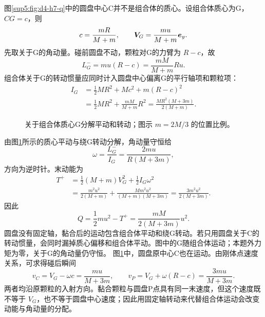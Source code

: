 \begin{solution}
图\ref{sup5:fig:d4-h7-q}中的圆盘中心C并不是组合体的质心。设组合体质心为G，$CG=c$，则
\begin{equation}
 c=\frac{mR}{M+m},\qquad
 \bm{V}_G=\frac{mu}{M+m}\bm{e}_y.
\end{equation}
先取关于G的角动量。碰前圆盘不动，颗粒对G的力臂为 $R-c$，故
\begin{equation}
 L_G^-=mu(R-c)=\frac{mM}{M+m}Ru.
\end{equation}
组合体关于G的转动惯量应同时计入圆盘中心偏离G的平行轴项和颗粒项：
\begin{align}
 I_G&=\frac12MR^2+Mc^2+m(R-c)^2\\
 &=\frac12MR^2+\frac{mM}{M+m}R^2
 =\frac{MR^2(M+3m)}{2(M+m)}.
\end{align}
\begin{figure}[H]\centering
{}
\caption{关于组合体质心G分解平动和转动；图示 $m=2M/3$ 的位置比例。}\label{sup5:fig:d4-h7-s}
\end{figure}
由图\ref{sup5:fig:d4-h7-s}所示的质心平动与绕G转动分解，角动量守恒给
\begin{equation}
 \omega=\frac{L_G^-}{I_G}=\frac{2mu}{R(M+3m)},
\end{equation}
方向为逆时针。末动能为
\begin{align}
 T^+&=\frac12(M+m)V_G^2+\frac12I_G\omega^2\\
 &=\frac{m^2u^2}{2(M+m)}
 +\frac{Mm^2u^2}{(M+m)(M+3m)}
 =\frac{3m^2u^2}{2(M+3m)}.
\end{align}
因此
\begin{equation}
 Q=\frac12mu^2-T^+=\frac{mM}{2(M+3m)}u^2.
\end{equation}
圆盘没有固定轴，黏合后的运动包含组合体平动和绕G转动。若只用圆盘关于C的转动惯量，会同时漏掉质心偏移和组合体平动。图中的G随组合体运动；本题外力矩为零，关于G的角动量仍守恒。
图\ref{sup5:fig:d4-h7-s}中，圆盘原中心C也在运动。由刚体点速度关系，可求得碰后瞬间
\[
v_C=V_G-\omega c=\frac{mu}{M+3m},\qquad
v_P=V_G+\omega(R-c)=\frac{3mu}{M+3m}.
\]
两者均沿原颗粒的入射方向。黏合颗粒与圆盘P点具有同一末速度，但这个速度既不等于 $V_G$，也不等于圆盘中心速度；因此用固定轴转动来代替组合体运动会改变动能与角动量的分配。

\end{solution}


